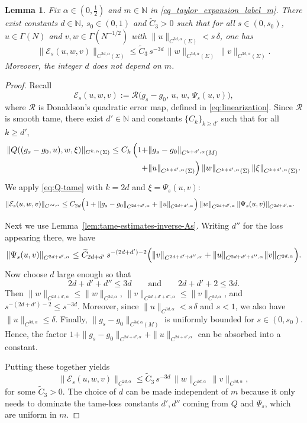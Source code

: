 \documentclass[11pt]{amsart}
\newcommand{\N}{\mathbb{N}}
\newtheorem{lemma}[theorem]{Lemma}
\begin{document}
\begin{lemma}
	\label{lem:tame-estimates-quadratic-error}
	Fix $\alpha\in(0,\tfrac12)$ and $m\in\N$ in \eqref{eq_taylor_expansion_label_m}.
	There exist constants $d\in\N$, $s_0\in(0,1)$ and $\widetilde C_3>0$ such that for all
	$s\in(0,s_0)$, $u\in\Gamma(N)$ and $v,w\in\Gamma(N^{-1/2})$ with
	$\|u\|_{C^{3d,\alpha}(\Sigma)}< s\,\delta$, one has
	\[
	\|\mathcal E_s(u,w,v)\|_{C^{2d,\alpha}(\Sigma)}
	\le \widetilde C_3\, s^{-3d}\,
	\|w\|_{C^{3d,\alpha}(\Sigma)}\,\|v\|_{C^{3d,\alpha}(\Sigma)}.
	\]
	Moreover, the integer $d$ does not depend on $m$.
\end{lemma}

\begin{proof}
	Recall
	\[
	\mathcal{E}_{s}(u,w,v):=\mathcal{R}\bigl(g_{s}-g_0,\,u,\,w,\,\Psi_{s}(u,v)\bigr),
	\]
	where $\mathcal{R}$ is Donaldson's quadratic error map, defined in \eqref{eq:linearization}.
	Since $\mathcal{R}$ is smooth tame, there exist $d'\in\N$ and constants $\{C_k\}_{k\ge d'}$
	such that for all $k\ge d'$,
	\begin{align}\label{eq:Q-tame}
		\|Q((g_s-g_0,u),w,\xi)\|_{C^{k,\alpha}(\Sigma)}
		\le C_k\,\Bigl(1+&\|g_s-g_0\|_{C^{k+d',\alpha}(M)}
		\\+&\|u\|_{C^{k+d',\alpha}(\Sigma)}\Bigr)\,
		\|w\|_{C^{k+d',\alpha}(\Sigma)}\,\|\xi\|_{C^{k+d',\alpha}(\Sigma)} . \notag
	\end{align}
	We apply \eqref{eq:Q-tame} with $k=2d$ and $\xi=\Psi_s(u,v)$:
	\begin{align*}
		\|\mathcal E_s(u,w,v)\|_{C^{2d,\alpha}}
		\le {}& C_{2d}\Bigl(1+\|g_s-g_0\|_{C^{2d+d',\alpha}}+\|u\|_{C^{2d+d',\alpha}}\Bigr)\,
		\|w\|_{C^{2d+d',\alpha}}\,
		\|\Psi_s(u,v)\|_{C^{2d+d',\alpha}} .
	\end{align*}
	
	Next we use Lemma~\ref{lem:tame-estimates-inverse-As}. Writing $d''$ for the loss
	appearing there, we have
	\begin{align*}
		\|\Psi_s(u,v)\|_{C^{2d+d',\alpha}}
		\le \widetilde C_{2d+d'}\, s^{-(2d+d')-2}\Bigl(
		\|v\|_{C^{2d+d'+d'',\alpha}}
		+\|u\|_{C^{2d+d'+d'',\alpha}}\|v\|_{C^{2d,\alpha}}
		\Bigr).
	\end{align*}
	Now choose $d$ large enough so that
	\[
	2d+d'+d''\le 3d
	\qquad\text{and}\qquad
	2d+d'+2\le 3d .
	\]
	Then $\|w\|_{C^{2d+d',\alpha}}\le \|w\|_{C^{3d,\alpha}}$,
	$\|v\|_{C^{2d+d'+d'',\alpha}}\le \|v\|_{C^{3d,\alpha}}$, and
	$s^{-(2d+d')-2}\le s^{-3d}$.
	Moreover, since $\|u\|_{C^{3d,\alpha}}<s\,\delta$ and $s<1$, we also have
	$\|u\|_{C^{3d,\alpha}}\le \delta$.
	Finally, $\|g_s-g_0\|_{C^{3d,\alpha}(M)}$ is uniformly bounded for $s\in(0,s_0)$.  
	Hence, the factor
	$1+\|g_s-g_0\|_{C^{2d+d',\alpha}}+\|u\|_{C^{2d+d',\alpha}}$
	can be absorbed into a constant.
	
	Putting these together yields
	\[
	\|\mathcal E_s(u,w,v)\|_{C^{2d,\alpha}}
	\le \widetilde C_3\, s^{-3d}\,
	\|w\|_{C^{3d,\alpha}}\,\|v\|_{C^{3d,\alpha}},
	\]
	for some $\widetilde C_3>0$.
	The choice of $d$ can be made independent of $m$ because it only needs to dominate
	the tame-loss constants $d',d''$ coming from $Q$ and $\Psi_s$, which are uniform in $m$.
\end{proof}
\end{document}
